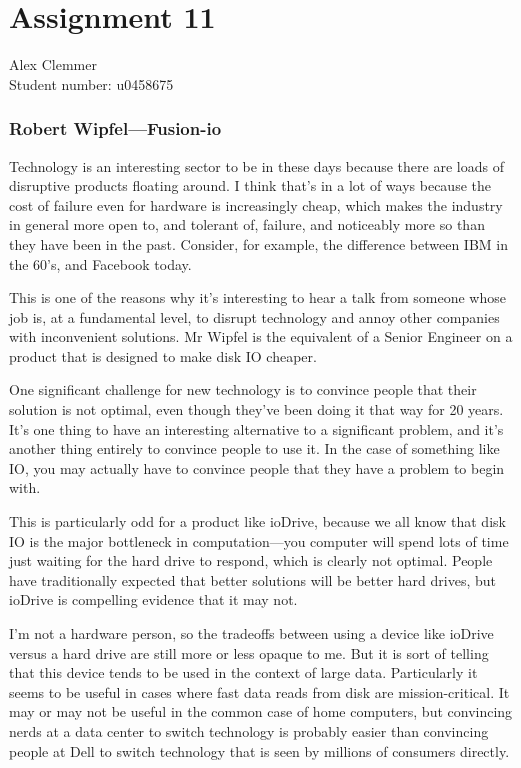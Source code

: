 \documentclass[a4paper]{article}
\begin{document}
\section*{Assignment 11}
Alex Clemmer \\
Student number: u0458675

\subsubsection*{Robert Wipfel---Fusion-io}

Technology is an interesting sector to be in these days because there are loads of disruptive products floating around. I think that's in a lot of ways because the cost of failure even for hardware is increasingly cheap, which makes the industry in general more open to, and tolerant of, failure, and noticeably more so than they have been in the past. Consider, for example, the difference between IBM in the 60's, and Facebook today.

This is one of the reasons why it's interesting to hear a talk from someone whose job is, at a fundamental level, to disrupt technology and annoy other companies with inconvenient solutions. Mr Wipfel is the equivalent of a Senior Engineer on a product that is designed to make disk IO cheaper.

One significant challenge for new technology is to convince people that their solution is not optimal, even though they've been doing it that way for 20 years. It's one thing to have an interesting alternative to a significant problem, and it's another thing entirely to convince people to use it. In the case of something like IO, you may actually have to convince people that they have a problem to begin with.

This is particularly odd for a product like ioDrive, because we all know that disk IO is the major bottleneck in computation---you computer will spend lots of time just waiting for the hard drive to respond, which is clearly not optimal. People have traditionally expected that better solutions will be better hard drives, but ioDrive is compelling evidence that it may not.

I'm not a hardware person, so the tradeoffs between using a device like ioDrive versus a hard drive are still more or less opaque to me. But it is sort of telling that this device tends to be used in the context of large data. Particularly it seems to be useful in cases where fast data reads from disk are mission-critical. It may or may not be useful in the common case of home computers, but convincing nerds at a data center to switch technology is probably easier than convincing people at Dell to switch technology that is seen by millions of consumers directly.
\end{document}
